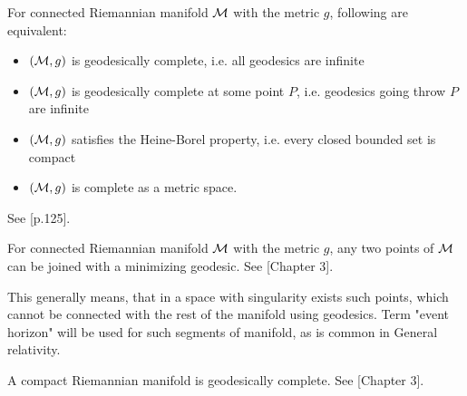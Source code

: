 \begin{thm}
    \label{thm:hopf-Rinow}
    For connected Riemannian manifold $\mathcal{M}$ with the metric $g$, following are equivalent:
\begin{itemize}
    \item $(\mathcal{M},g)$ is geodesically complete, i.e. all geodesics are infinite
    \item $(\mathcal{M},g)$ is geodesically complete at some point $P$, i.e. geodesics going throw $P$ are infinite
    \item $(\mathcal{M},g)$ satisfies the Heine-Borel property, i.e. every closed bounded set is compact
    \item $(\mathcal{M},g)$ is complete as a metric space.
\end{itemize}
See \citet{petersen}[p.125].
\end{thm}
\begin{thm}
    \label{thm:hopf-Rinow_modified}
    For connected Riemannian manifold $\mathcal{M}$ with the metric $g$, any two points of $\mathcal{M}$ can be joined with a minimizing geodesic. See \citet{claudio}[Chapter 3].
\end{thm}
This generally means, that in a space with singularity exists such points, which cannot be connected with the rest of the manifold using geodesics. Term "event horizon" will be used for such segments of manifold, as is common in General relativity.

\begin{thm}
    \label{thm:compact}
    A compact Riemannian manifold is geodesically complete. See \citet{claudio}[Chapter 3].
\end{thm}






